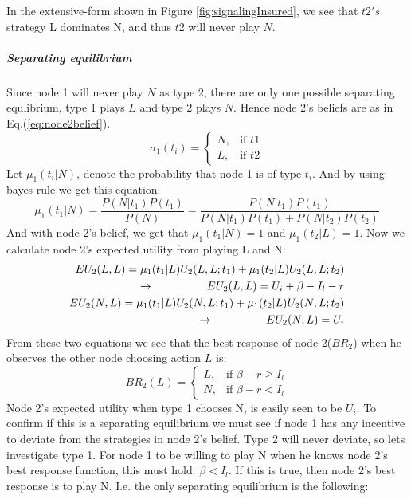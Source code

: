 In the extensive-form shown in Figure \ref{fig:signalingInsured}, we see that $t2's$ strategy L dominates N, and thus $t2$ will never play $N$.
\subparagraph{Separating equilibrium}
Since node 1 will never play $N$ as type 2, there are only one possible separating equlibrium, type 1 plays $L$ and type 2 plays $N$. Hence node 2's beliefs are as in Eq.(\ref{eq:node2belief}).
\begin{equation}
    \sigma_{1}(t_{i})= 
\begin{cases}
   N,& \text{if } t1\\
   L,& \text{if } t2  
\end{cases}
\label{eq:node2belief}
\end{equation}
Let $\mu_{1}(t_{i} | N )$, denote the probability that node 1 is of type $t_{i}$. And by using bayes rule we get this equation:
\begin{equation}
\mu_{1}(t_{1} | N )=\frac{P(N|t_{1})P(t_{1})}{P(N)}=\frac{P(N|t_{1})P(t_{1})}{P(N|t_{1})P(t_{1})+P(N|t_{2})P(t_{2})}
\end{equation}
And with node 2's belief, we get that $\mu_{1}(t_{1} | N )=1$ and $\mu_{1}(t_{2} | L )= 1 $. Now we calculate node 2's expected utility from playing L and N:
\begin{eqnarray}
EU_{2}(L,L)=\mu_{1}(t_{1} | L )U_{2}(L,L;t_{1})+\mu_{1}(t_{2} | L )U_{2}(L,L;t_{2}) \nonumber\\
\llap{$\rightarrow$\hspace{50pt}}EU_{2}(L,L)=U_{i}+\beta-I_{l}-r \\
EU_{2}(N,L)=\mu_{1}(t_{1} | L )U_{2}(N,L;t_{1})+\mu_{1}(t_{2} | L )U_{2}(N,L;t_{2})\nonumber\\
\llap{$\rightarrow$\hspace{50pt}}EU_{2}(N,L)=U_{i}
\end{eqnarray}
From these two equations we see that the best response of node 2($BR_2$) when he observes the other node choosing action $L$ is:
\begin{equation}
BR_{2}(L)=
\begin{cases}
L, & \text{if }\beta - r \geq I_{l}\\
N, & \text{if } \beta -r<I_{l}
\end{cases}
\label{eq:insuredBR}
\end{equation}
Node 2's expected utility when type 1 chooses N, is easily seen to be $U_{i}$. 
To confirm if this is a separating equilibrium we must see if node 1 has any incentive to deviate from the strategies in node 2's belief.
Type 2 will never deviate, so lets investigate type 1.
For node 1 to be willing to play N when he knows node 2's best response function, this must hold: $\beta<I_{l}$. If this is true, then node 2's best response is to play N. I.e. the only separating equilibrium is the following:

